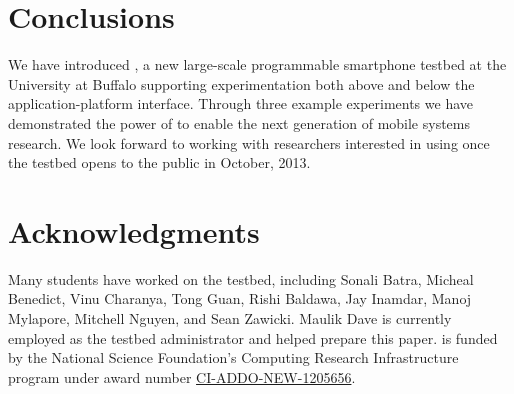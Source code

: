 \section{Conclusions}
\label{sec-conclusions}

We have introduced \PhoneLab{}, a new large-scale programmable smartphone
testbed at the University at Buffalo supporting experimentation both above
and below the application-platform interface. Through three example
experiments we have demonstrated the power of \PhoneLab{} to enable the next
generation of mobile systems research. We look forward to working with
researchers interested in using \PhoneLab{} once the testbed opens to the
public in October, 2013.

\section*{Acknowledgments}

Many students have worked on the \PhoneLab{} testbed, including Sonali Batra,
Micheal Benedict, Vinu Charanya, Tong Guan, Rishi Baldawa, Jay Inamdar, Manoj
Mylapore, Mitchell Nguyen, and Sean Zawicki. Maulik Dave is currently
employed as the testbed administrator and helped prepare this paper.
\PhoneLab{} is funded by the National Science Foundation's Computing Research
Infrastructure program under award number
\href{http://www.nsf.gov/awardsearch/showAward?AWD\_ID=1205656}{CI-ADDO-NEW-1205656}.
